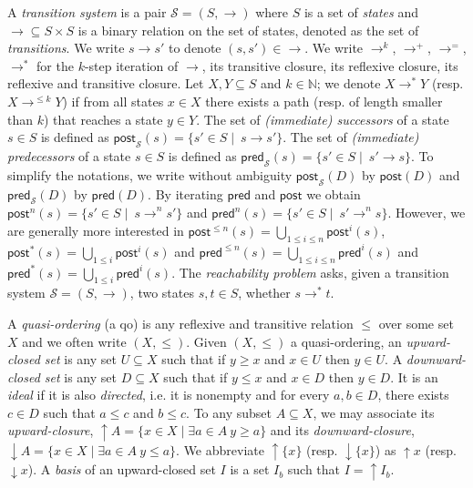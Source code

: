 \documentclass[runningheads]{llncs}
\newcommand{\pred}{\textsf{pred}}
\newcommand{\post}{\textsf{post}}
\begin{document}
\noindent
 A {\em transition system} is a pair $\mathscr{S} = (S,\rightarrow )$ where $S$ is a set of 
 {\em states} and  
 $ {\rightarrow} \subseteq S \times S$ is a
 binary relation 
 on
 the set of states, denoted as the set of {\em transitions}. 
%
We write $s \rightarrow s'$ to denote $ (s,s') \in  {\rightarrow} $.
We write $\rightarrow^{k}$, $\rightarrow^{+}$, $\rightarrow^{=}$, $\rightarrow^{*}$
for the $k$-step iteration of $\rightarrow$, its transitive closure, its reflexive closure, its reflexive and transitive closure.
Let $X,Y \subseteq S$ and $k \in \mathbb{N}$; we denote $X \longrightarrow^{*} Y$ (resp. $X \longrightarrow^{\leq k} Y$) if from all states $x \in X$ there exists a path (resp. of length smaller than $k$) that reaches a state $y \in Y$.
\noindent
The set of {\em (immediate) successors} of a state $s \in S$ is defined as 
 $\post_{\mathscr{S}}(s) = \{ s' \in S \mid  ~ s \xrightarrow{} s'\}$. 
The set of {\em (immediate) predecessors} of a state $s \in S$ is deﬁned as
 $\pred_{\mathscr{S}}(s) = \{ s' \in S \mid  ~ s' \xrightarrow{} s\}$. 
To simplify the notations, we write without ambiguity $\post_{\mathscr{S}}(D)$ by $\post(D)$ and  $\pred_{\mathscr{S}}(D)$ by  $\pred(D)$.
By iterating $\pred$ and $\post$ we obtain  
$\post^n(s) = \{ s' \in S \mid  ~ s \xrightarrow{}^n s'\}$
and
$\pred^n(s) = \{ s' \in S \mid  ~ s' \xrightarrow{}^n s\}$.
However, we are generally more interested in
$\post^{\leq n}(s) = \bigcup_{1 \leq i \leq n} \post^i(s)$, $\post^*(s)= \bigcup_{1 \leq i} \post^i(s)$
and
$\pred^{\leq n}(s) = \bigcup_{1 \leq i \leq n} \pred^i(s)$ and $\pred^*(s) = \bigcup_{1 \leq i} \pred^i(s)$. 
The {\em reachability problem} asks, given a transition system $\mathscr{S} = (S, \to)$, two states $s, t \in S$, whether $s \to^* t$. 

%


A {\em quasi-ordering} (a qo) is any reflexive and transitive relation $\leq$ over some set $X$ and we often write $(X,\leq)$. 
Given $(X,\leq)$ a quasi-ordering, an {\em upward-closed set} is any set $U \subseteq X$ such that if $y \geq x$ and $x \in U$ then $y \in U $.
A {\em downward-closed set} is any set $D \subseteq X$ such that if $y \leq x$ and $x \in D$ then $y \in D $. 
It is an {\em ideal } if it is also {\em directed}, i.e. it is nonempty and for every $a,b \in D$, there exists $c \in D$ such that $a \leq c$ and $b \leq c$.
To any subset $A \subseteq X$, we may associate
its {\em upward-closure},
 $\uparrow A = \{x \in X \mid \exists a \in A ~ y \geq a\}$
 and its 
 {\em downward-closure},
 $\downarrow A = \{x \in X \mid \exists a \in A ~ y \leq a\}$. 
We abbreviate $\uparrow \{x\}$ (resp. $\downarrow \{x\}$)
as $\uparrow x$ (resp. $\downarrow x$).
%
A {\em basis} of an upward-closed set $I$ is a set $I_b$ such that $I = \uparrow I_b$. 
\end{document}
